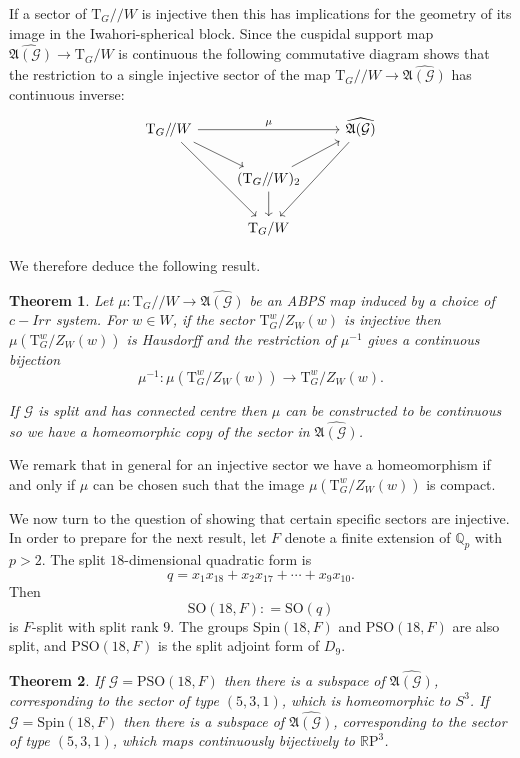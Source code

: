 \documentclass[11pt,a4paper]{article}
\newtheorem{theorem}{Theorem}
\def\Spin{\mathrm{Spin}}
\def\SO{\mathrm{SO}}
\def\PSO{\mathrm{PSO}}
\def\fA{\mathfrak{A}}
\def\R{\mathbb{R}}
\def\Q{\mathbb{Q}}
\def\fA{\mathfrak{A}}
\def\RP{\R\mathrm{P}}
\def\q {{/\!/}}
\def\bT{\mathrm{T}}
\def\G{\mathcal{G}}
\begin{document}
If a sector of $\bT_G\q W$ is injective then this has implications for the geometry of its image in the Iwahori-spherical block. Since the cuspidal support map $\widehat{\fA(\G)}\to \bT_G/W$ is continuous the following commutative diagram shows that the restriction to a single injective sector of the map $\bT_G\q W\to\widehat{\fA(\G)}$ has continuous inverse:
\[
\begin{tikzcd}
\bT_G\q W \arrow[rr,
"\mu"]\arrow[dr]\arrow[ddr]& &\widehat{\fA(\G)}\arrow[ddl] \\
&(\bT_G\q W)_2 \arrow[ur] \arrow[d]&\\
  &\bT_G/W
\end{tikzcd}
\]

We therefore deduce the following result.

\begin{theorem}
    Let $\mu:\bT_G\q W\to \widehat{\fA(\G)}$ be an ABPS map induced by a choice of $c-Irr$ system. For $w\in W$, if the sector $\bT_G^w/Z_W(w)$ is injective then $\mu(\bT_G^w/Z_W(w))$ is Hausdorff and the restriction of $\mu^{-1}$ gives a continuous bijection
    \[
    \mu^{-1}:\mu(\bT_G^w/Z_W(w))\to\bT_G^w/Z_W(w).
    \]

    
    If $\G$ is split and has connected centre then $\mu$ can be constructed to be continuous so we have a homeomorphic copy of the sector in $\widehat{\fA(\G)}$.
\end{theorem}

We remark that in general for an injective sector we have a homeomorphism if and only if $\mu$ can be chosen such that the image $\mu(\bT_G^w/Z_W(w))$ is compact.

We now turn to the question of showing that certain specific sectors are injective.   In order to prepare for the next result, let $F$ denote a finite extension of $\Q_p$ with $p > 2$.   The split $18$-dimensional quadratic form is 
\[
q = x_1x_{18} + x_2x_{17} + \cdots + x_9x_{10}.
\]
Then
\[
\SO(18,F): = \SO(q)
\]
is $F$-split with split rank $9$.   The groups $\Spin(18,F)$ and $\PSO(18,F)$ are also split, and   $\PSO(18,F)$ is the split adjoint form of $D_9$.   
   

\begin{theorem}
If $\G=\PSO(18,F)$  then there is a subspace of $\widehat{\fA(\G)}$, corresponding to the sector of type $(5,3,1)$, which is homeomorphic to $S^3$. If $\G=\Spin(18,F)$ then there is a subspace of $\widehat{\fA(\G)}$, corresponding to the sector of type $(5,3,1)$, which maps continuously bijectively to $\RP^3$.
\end{theorem}
\end{document}
